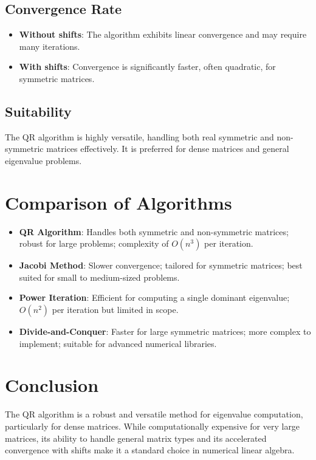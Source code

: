 \documentclass[12pt]{article}
\begin{document}
\subsection{Convergence Rate}
\begin{itemize}
    \item \textbf{Without shifts}: The algorithm exhibits linear convergence and may require many iterations.
    \item \textbf{With shifts}: Convergence is significantly faster, often quadratic, for symmetric matrices.
\end{itemize}

\subsection{Suitability}
The QR algorithm is highly versatile, handling both real symmetric and non-symmetric matrices effectively. It is preferred for dense matrices and general eigenvalue problems.

\section{Comparison of Algorithms}

\begin{itemize}
    \item \textbf{QR Algorithm}: Handles both symmetric and non-symmetric matrices; robust for large problems; complexity of $O(n^3)$ per iteration.
    \item \textbf{Jacobi Method}: Slower convergence; tailored for symmetric matrices; best suited for small to medium-sized problems.
    \item \textbf{Power Iteration}: Efficient for computing a single dominant eigenvalue; $O(n^2)$ per iteration but limited in scope.
    \item \textbf{Divide-and-Conquer}: Faster for large symmetric matrices; more complex to implement; suitable for advanced numerical libraries.
\end{itemize}

\section{Conclusion}

The QR algorithm is a robust and versatile method for eigenvalue computation, particularly for dense matrices. While computationally expensive for very large matrices, its ability to handle general matrix types and its accelerated convergence with shifts make it a standard choice in numerical linear algebra.
\end{document}
